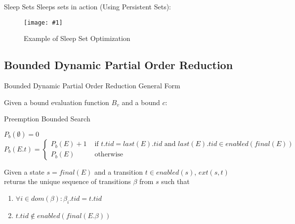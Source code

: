 \documentclass[9pt]{beamer}
\newcommand{\trace}[2]{
\begin{figure}[H]
\centering
\texttt{[image: \#1]}
\caption{#2}
\label{#2}
\end{figure}
}
\begin{document}
\begin{frame}{Sleep Sets}
Sleeps sets in action (Using Persistent Sets):
\trace{../img/sleep.pdf}{Example of Sleep Set Optimization}
\end{frame}

\subsection{Bounded Dynamic Partial Order Reduction}

\begin{frame}{Bounded Dynamic Partial Order Reduction General Form}

Given a bound evaluation function $B_v$ and a bound $c$:

\begin{figure}
\end{figure}
    
\end{frame}

\begin{frame}{Preemption Bounded Search}

\begin{definition}
$P_b(\emptyset) = 0$ \\
$P_b(E.t) = 
 \begin{cases} 
    P_b(E) + 1 & \text{ if } t.tid = last(E).tid \text{ and } last(E).tid \in enabled(final(E)) \\
    P_b(E) & \text{ otherwise }
 \end{cases}
$
\end{definition}
    
\end{frame}

\begin{frame}

\begin{definition}[$ext(s,t)$]
    Given a state $s = final(E)$ and a transition $t \in enabled(s)$,
    $ext(s,t)$ returns the unique sequence of transitions $\beta$ from $s$
    such that
    \begin{enumerate}
        \item $\forall i \in dom(\beta): \beta_i.tid = t.tid$
        \item $t.tid \notin enabled(final(E.\beta))$
    \end{enumerate}
\end{definition}
    
\end{frame}
\end{document}
